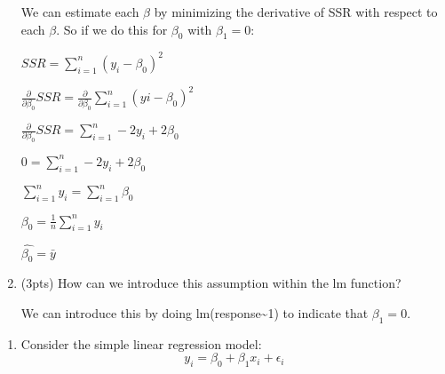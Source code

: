 \documentclass[
]{article}
\providecommand{\tightlist}{%
  \setlength{\itemsep}{0pt}\setlength{\parskip}{0pt}}
\begin{document}
\begin{enumerate}
  We can estimate each \(\beta\) by minimizing the derivative of SSR
  with respect to each \(\beta\). So if we do this for \(\beta_0\) with
  \(\beta_1=0\):

  \(SSR = \sum_{i=1}^{n}(y_i-\beta_0)^2\)

  \(\frac{\partial}{\partial\beta_0} SSR  = \frac{\partial}{\partial\beta_0} \sum_{i=1}^n(yi-\beta_0)^2\)

  \(\frac{\partial}{\partial\beta_0} SSR = \sum_{i=1}^n-2y_i+2\beta_0\)

  \(0 = \sum_{i=1}^n-2y_i+2\beta_0\)

  \(\sum_{i=1}^n y_i = \sum_{i=1}^n \beta_0\)

  \(\beta_0 = \frac{1}{n}\sum_{i=1}^ny_i\)

  \(\hat{\beta_0} = \bar{y}\)
\item
  (3pts) How can we introduce this assumption within the lm function?

  We can introduce this by doing lm(response\textasciitilde1) to
  indicate that \(\beta_1=0\).
\end{enumerate}

\begin{enumerate}
\def\labelenumi{\arabic{enumi}.}
\setcounter{enumi}{2}
\tightlist
\item
  Consider the simple linear regression model:
  \[y_i = \beta_0 + \beta_1x_i + \epsilon_i\]
\end{enumerate}
\end{document}
